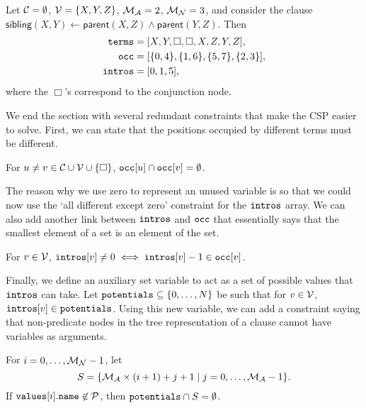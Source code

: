 \begin{example} \label{example:sibling}
  Let $\mathcal{C}{} = \emptyset$, $\mathcal{V}{} = \{ X, Y, Z \}$, $\mathcal{M}_{\mathcal{A}}{} =
  2$, $\mathcal{M}_{\mathcal{N}}{} = 3$, and consider the clause $\mathsf{sibling}(X, Y)
  \gets \mathsf{parent}(X, Z) \land \mathsf{parent}(Y, Z)$. Then
  \begin{align*}
    \texttt{\textup{terms}} &= [X, Y, \Box, \Box, X, Z, Y, Z], \\
    \texttt{\textup{occ}} &= [\{ 0, 4 \}, \{ 1, 6 \}, \{ 5, 7 \}, \{ 2, 3 \}], \\
    \texttt{\textup{intros}} &= [0, 1, 5],
  \end{align*}
  where the $\Box$'s correspond to the conjunction node.
\end{example}

We end the section with several redundant constraints that make the CSP easier
to solve. First, we can state that the positions occupied by different terms
must be different.
\begin{constraint} \label{constraint:all_diff}
  For $u \ne v \in \mathcal{C}{} \cup \mathcal{V}{} \cup \{ \Box \}$,
  $\texttt{\textup{occ}}[u] \cap \texttt{\textup{occ}}[v] = \emptyset$.
\end{constraint}
The reason why we use zero to represent an unused variable is so that we could
now use the `all different except zero' constraint for the $\texttt{\textup{intros}}$
array. We can also add another link between $\texttt{\textup{intros}}$ and
$\texttt{\textup{occ}}$ that essentially says that the smallest element of a set is an
element of the set.
\begin{constraint}
  For $v \in \mathcal{V}{}$, $\texttt{\textup{intros}}[v] \ne 0 \iff
  \texttt{\textup{intros}}[v] - 1 \in \texttt{\textup{occ}}[v]$.
\end{constraint}
Finally, we define an auxiliary set variable to act as a set of possible values
that $\texttt{\textup{intros}}$ can take. Let $\texttt{\textup{potentials}} \subseteq \{ 0,
\dots, N \}$ be such that for $v \in \mathcal{V}{}$, $\texttt{\textup{intros}}[v] \in
\texttt{\textup{potentials}}$. Using this new variable, we can add a constraint saying
that non-predicate nodes in the tree representation of a clause cannot have
variables as arguments.
\begin{constraint} \label{constraint:potentialIntroductions}
  For $i = 0, \dots, \mathcal{M}_{\mathcal{N}}{} - 1$, let
  \[
    S = \{ \mathcal{M}_{\mathcal{A}}{} \times (i + 1) + j + 1 \mid j = 0, \dots, \mathcal{M}_{\mathcal{A}}{} - 1
    \}.
  \]
  If $\texttt{\textup{values}}[i].\texttt{\textup{name}} \not\in \mathcal{P}{}$, then
  $\texttt{\textup{potentials}} \cap S = \emptyset$.
\end{constraint}

